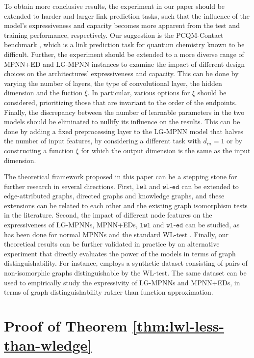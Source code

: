 \documentclass{article}
\newcommand{\wledge}{\texttt{wl-ed}}
\newcommand{\lwl}{\texttt{lwl}}
\begin{document}
To obtain more conclusive results, the experiment in our paper should be extended to harder and larger link prediction tasks, such that the influence of the model's expressiveness and capacity becomes more apparent from the test and training performance, respectively. Our suggestion is the PCQM-Contact benchmark \cite{dwivedi2022LRGB}, which is a link prediction task for quantum chemistry known to be difficult.
Further, the experiment should be extended to a more diverse range of MPNN+ED and LG-MPNN instances
to examine the impact of different design choices on the architectures' expressiveness and capacity.
This can be done by varying the number of layers, the type of convolutional layer, the hidden dimension and the fuction $\xi$. In particular, various options for $\xi$ should be considered, prioritizing those that are invariant to the order of the endpoints.
Finally, the discrepancy between the number of learnable parameters in the two models should be eliminated to nullify its influence on the results. This can be done by adding a fixed preprocessing layer to the LG-MPNN model that halves the number of input features, by considering a different task with $d_{in}=1$ or by constructing a function $\xi$ for which the output dimension is the same as the input dimension.

The theoretical framework proposed in this paper can be a stepping stone for further research in several directions.
First, $\lwl$ and $\wledge$ can be extended to edge-attributed graphs, directed graphs and knowledge graphs, and these extensions can be related to each other and the existing graph isomorphism tests in the literature.
Second, the impact of different node features on the expressiveness of LG-MPNNs, MPNN+EDs, $\lwl$ and $\wledge$ can be studied, as has been done for normal MPNNs and the standard WL-test \cite{sato2021random,feldman2022weisfeiler}.
Finally, our theoretical results can be further validated in practice by an alternative experiment that directly evaluates the power of the models in terms of graph distinguishability. For instance, \cite{bianchi2024expressive} employs a synthetic dataset consisting of pairs of non-isomorphic graphs distinguishable by the WL-test. The same dataset can be used to empirically study the expressivity of LG-MPNNs and MPNN+EDs, in terms of graph distinguishability rather than function approximation.

\clearpage

\appendix
\section{Proof of Theorem \ref{thm:lwl-less-than-wledge}}   \label{app:proof-lwl-less-than-wledge}
\end{document}
